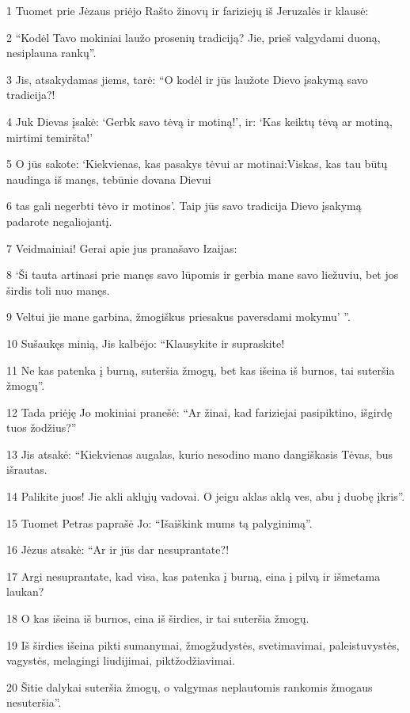 \par 1 Tuomet prie Jėzaus priėjo Rašto žinovų ir fariziejų iš Jeruzalės ir klausė: 
\par 2 “Kodėl Tavo mokiniai laužo prosenių tradiciją? Jie, prieš valgydami duoną, nesiplauna rankų”. 
\par 3 Jis, atsakydamas jiems, tarė: “O kodėl ir jūs laužote Dievo įsakymą savo tradicija?! 
\par 4 Juk Dievas įsakė: ‘Gerbk savo tėvą ir motiną!’, ir: ‘Kas keiktų tėvą ar motiną, mirtimi temiršta!’ 
\par 5 O jūs sakote: ‘Kiekvienas, kas pasakys tėvui ar motinai:­Viskas, kas tau būtų naudinga iš manęs, tebūnie dovana Dievui­ 
\par 6 tas gali negerbti tėvo ir motinos’. Taip jūs savo tradicija Dievo įsakymą padarote negaliojantį. 
\par 7 Veidmainiai! Gerai apie jus pranašavo Izaijas: 
\par 8 ‘Ši tauta artinasi prie manęs savo lūpomis ir gerbia mane savo liežuviu, bet jos širdis toli nuo manęs. 
\par 9 Veltui jie mane garbina, žmogiškus priesakus paversdami mokymu’ ”. 
\par 10 Sušaukęs minią, Jis kalbėjo: “Klausykite ir supraskite! 
\par 11 Ne kas patenka į burną, suteršia žmogų, bet kas išeina iš burnos, tai suteršia žmogų”. 
\par 12 Tada priėję Jo mokiniai pranešė: “Ar žinai, kad fariziejai pasipiktino, išgirdę tuos žodžius?” 
\par 13 Jis atsakė: “Kiekvienas augalas, kurio nesodino mano dangiškasis Tėvas, bus išrautas. 
\par 14 Palikite juos! Jie akli aklųjų vadovai. O jeigu aklas aklą ves, abu į duobę įkris”. 
\par 15 Tuomet Petras paprašė Jo: “Išaiškink mums tą palyginimą”. 
\par 16 Jėzus atsakė: “Ar ir jūs dar nesuprantate?! 
\par 17 Argi nesuprantate, kad visa, kas patenka į burną, eina į pilvą ir išmetama laukan? 
\par 18 O kas išeina iš burnos, eina iš širdies, ir tai suteršia žmogų. 
\par 19 Iš širdies išeina pikti sumanymai, žmogžudystės, svetimavimai, paleistuvystės, vagystės, melagingi liudijimai, piktžodžiavimai. 
\par 20 Šitie dalykai suteršia žmogų, o valgymas neplautomis rankomis žmogaus nesuteršia”. 
